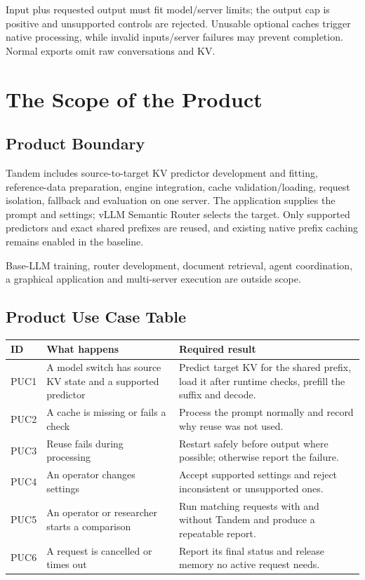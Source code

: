 \documentclass[12pt]{article}
\begin{document}
Input plus requested output must fit model/server limits; the output cap is
positive and unsupported controls are rejected. Unusable optional caches
trigger native processing, while invalid inputs/server failures may prevent
completion. Normal exports omit raw conversations and KV.

\section{The Scope of the Product}


\subsection{Product Boundary}
Tandem includes source-to-target KV predictor development and fitting,
reference-data preparation, engine integration, cache validation/loading,
request isolation, fallback and evaluation on one server. The application
supplies the prompt and settings; vLLM Semantic Router selects the target.
Only supported predictors and exact shared prefixes are reused, and existing
native prefix caching remains enabled in the baseline.

Base-LLM training, router development, document retrieval, agent coordination,
a graphical application and multi-server execution are outside scope.


\subsection{Product Use Case Table}
\begin{longtable}{@{}p{}p{}p{}@{}}
\toprule ID & What happens & Required result\\\midrule\endhead
PUC1 & A model switch has source KV state and a supported predictor & Predict target KV for the shared prefix, load it after runtime checks, prefill the suffix and decode.\\
PUC2 & A cache is missing or fails a check & Process the prompt normally and record why reuse was not used.\\
PUC3 & Reuse fails during processing & Restart safely before output where possible; otherwise report the failure.\\
PUC4 & An operator changes settings & Accept supported settings and reject inconsistent or unsupported ones.\\
PUC5 & An operator or researcher starts a comparison & Run matching requests with and without Tandem and produce a repeatable report.\\
PUC6 & A request is cancelled or times out & Report its final status and release memory no active request needs.\\
\bottomrule
\end{longtable}
\end{document}
